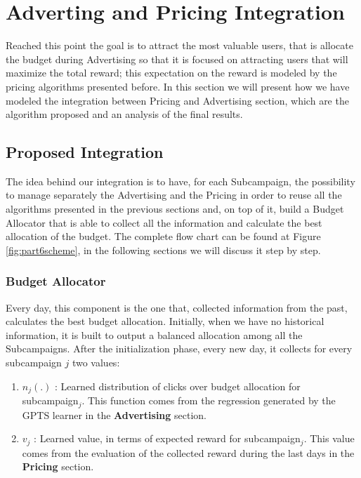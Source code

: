 \chapter{Adverting and Pricing Integration}

Reached this point the goal is to attract the most valuable users, that is allocate the budget during Advertising so that it is focused on attracting users that will maximize the total reward; this expectation on the reward is modeled by the pricing algorithms presented before. In this section we will present how we have modeled the integration between Pricing and Advertising section, which are the algorithm proposed and an analysis of the final results.

\section{Proposed Integration}
The idea behind our integration is to have, for each Subcampaign, the possibility to manage separately the Advertising and the Pricing in order to reuse all the algorithms presented in the previous sections and, on top of it, build a Budget Allocator that is able to collect all the information and calculate the best allocation of the budget. The complete flow chart can be found at Figure \ref{fig:part6scheme}, in the following sections we will discuss it step by step.

    \subsection{Budget Allocator}
    Every day, this component is the one that, collected information from the past, calculates the best budget allocation. Initially, when we have no historical information, it is built to output a balanced allocation among all the Subcampaigns. After the initialization phase, every new day, it collects for every subcampaign $ j $ two values:
    
    \begin{enumerate}
        \item $ n_j (.) $ : Learned distribution of clicks over budget allocation for subcampaign$_j$. This function comes from the regression generated by the GPTS learner in the   \textbf{Advertising} section.
        \item $ v_j $ : Learned value, in terms of expected reward for subcampaign$_j$. This value comes from the evaluation of the collected reward during the last days in the \textbf{Pricing} section.
    \end{enumerate} 

